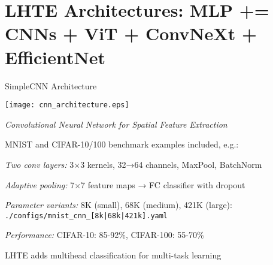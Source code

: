 \section[toc={New Architectures}]{LHTE Architectures: MLP += \\
  CNNs + ViT + ConvNeXt + EfficientNet}

\begin{slidewhite}[\slideopts,toc={CNN}]{SimpleCNN Architecture}
  
  \centerline{\texttt{[image: cnn\_architecture.eps]}}

  \emph{Convolutional Neural Network for Spatial Feature Extraction}
  
  \begin{itemize}
    \mpitem MNIST and CIFAR-10/100 benchmark examples included, e.g.:
    \begin{itemize}

      \mpitem \emph{Two conv layers:} 3×3 kernels, 32→64 channels, MaxPool, BatchNorm
      
      \mpitem \emph{Adaptive pooling:} 7×7 feature maps → FC classifier with dropout
      
      \mpitem \emph{Parameter variants:} 8K (small), 68K (medium), 421K (large):\\
      \texttt{./configs/mnist\_cnn\_[8k|68k|421k].yaml}
      
      \mpitem \emph{Performance:} CIFAR-10: 85-92\%, CIFAR-100: 55-70\%
    \end{itemize}
    
    \mpitem LHTE adds multihead classification for multi-task learning
  \end{itemize}
  
\end{slidewhite}

